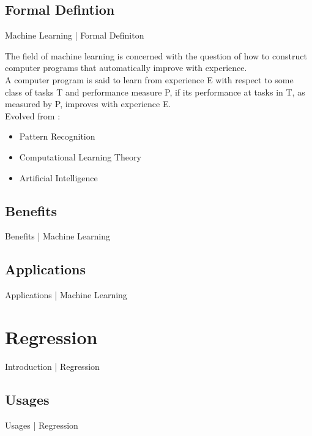 \documentclass[10pt]{beamer}
\begin{document}
		\subsection{Formal Defintion}
			\begin{frame}{Machine Learning | Formal Definiton}
				\begin{center}
					\small{The field of machine learning is concerned with the question of how to construct computer programs that automatically improve with experience.}\\
					\bigskip
					\large{A computer program is said to learn from experience E with respect to some class of tasks T and performance measure P, if its performance at tasks in T, as measured by P, improves with experience E.}\\
					\bigskip
					\small{Evolved from :}
					\begin{itemize}
						\item {\small Pattern Recognition}
						\item {\small Computational Learning Theory}
						\item {\small Artificial Intelligence}
					\end{itemize}
				\end{center}
			\end{frame}
		\subsection{Benefits}
			\begin{frame}{Benefits | Machine Learning}
			\end{frame}
		\subsection{Applications}
			\begin{frame}{Applications | Machine Learning}
			\end{frame}
	
	\section{Regression}
		\begin{frame}{Introduction | Regression}
		\end{frame}
		\subsection{Usages}
			\begin{frame}{Usages | Regression}
			\end{frame}
\end{document}
